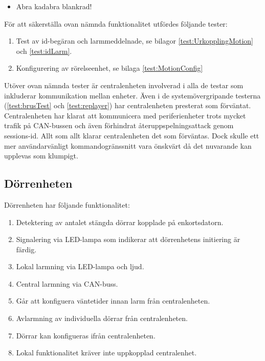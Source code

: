 \documentclass{article}
\begin{document}
 \begin{itemize}
\color{white}
\item Abra kadabra blankrad!
\end{itemize}

 För att säkerställa ovan nämnda funktionalitet utfördes följande tester:
 \begin{enumerate}
     \item Test av id-begäran och larmmeddelnade, se bilagor \ref{test:UrkopplingMotion} och \ref{test:idLarm}.
     \item Konfigurering av rörelseenhet, se bilaga \ref{test:MotionConfig}
\end{enumerate}

Utöver ovan nämnda tester är centralenheten involverad i alla de testar som inkluderar kommunikation mellan enheter. Även i de systemövergripande testerna (\ref{test:brusTest} och \ref{test:replayer}) har centralenheten presterat som förväntat. Centralenheten har klarat att kommunicera med periferienheter trots mycket trafik på CAN-bussen och även förhindrat återuppspelningsattack genom sessions-id. Allt som allt klarar centralenheten det som förväntas. Dock skulle  ett mer användarvänligt kommandogränssnitt vara önskvärt då det nuvarande kan upplevas som klumpigt.



 \subsection{Dörrenheten}
 Dörrenheten har följande funktionalitet:
 \begin{enumerate}
     \item Detektering av antalet stängda dörrar kopplade på enkortsdatorn.
     \item Signalering via LED-lampa som indikerar att dörrenhetens initiering är färdig.
     \item Lokal larmning via LED-lampa och ljud.
     \item Central larmning via CAN-buss.
     \item Går att konfiguera väntetider innan larm från centralenheten.
     \item Avlarmning av individuella dörrar från centralenheten.
     \item Dörrar kan konfigueras ifrån centralenheten.
     \item Lokal funktionalitet kräver inte uppkopplad centralenhet.
 \end{enumerate}
\end{document}
